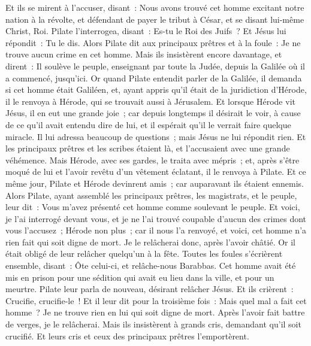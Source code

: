 \begin{multicols}{2}
Et ils se mirent à l'accuser, disant~: Nous avons trouvé cet homme excitant notre nation à la révolte, et défendant de payer le tribut à César, et se disant lui-même Christ, Roi.
Pilate l'interrogea, disant~: Es-tu le Roi des Juifs~? Et Jésus lui répondit~: Tu le dis.
Alors Pilate dit aux principaux prêtres et à la foule~: Je ne trouve aucun crime en cet homme.
Mais ils insistèrent encore davantage, et dirent~: Il soulève le peuple, enseignant par toute la Judée, depuis la Galilée où il a commencé, jusqu'ici.
Or quand Pilate entendit parler de la Galilée, il demanda si cet homme était Galiléen,
et, ayant appris qu'il était de la juridiction d'Hérode, il le renvoya à Hérode, qui se trouvait aussi à Jérusalem.
Et lorsque Hérode vit Jésus, il en eut une grande joie~; car depuis longtemps il désirait le voir, à cause de ce qu'il avait entendu dire de lui, et il espérait qu'il le verrait faire quelque miracle.
Il lui adressa beaucoup de questions~; mais Jésus ne lui répondit rien.
Et les principaux prêtres et les scribes étaient là, et l'accusaient avec une grande véhémence.
Mais Hérode, avec ses gardes, le traita avec mépris~; et, après s'être moqué de lui et l'avoir revêtu d'un vêtement éclatant, il le renvoya à Pilate.
Et ce même jour, Pilate et Hérode devinrent amis~; car auparavant ils étaient ennemis.
Alors Pilate, ayant assemblé les principaux prêtres, les magistrats, et le peuple, leur dit~:
Vous m'avez présenté cet homme comme soulevant le peuple. Et voici, je l'ai interrogé devant vous, et je ne l'ai trouvé coupable d'aucun des crimes dont vous l'accusez~;
Hérode non plus~; car il nous l'a renvoyé, et voici, cet homme n'a rien fait qui soit digne de mort.
Je le relâcherai donc, après l'avoir châtié.
Or il était obligé de leur relâcher quelqu'un à la fête.
Toutes les foules s'écrièrent ensemble, disant~: Ôte celui-ci, et relâche-nous Barabbas.
Cet homme avait été mis en prison pour une sédition qui avait eu lieu dans la ville, et pour un meurtre.
Pilate leur parla de nouveau, désirant relâcher Jésus.
Et ils crièrent~: Crucifie, crucifie-le~!
Et il leur dit pour la troisième fois~: Mais quel mal a fait cet homme~? Je ne trouve rien en lui qui soit digne de mort. Après l'avoir fait battre de verges, je le relâcherai.
Mais ils insistèrent à grands cris, demandant qu'il soit crucifié. Et leurs cris et ceux des principaux prêtres l'emportèrent.

\end{multicols}
